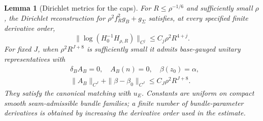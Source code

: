 \documentclass[11pt]{amsart}
\newtheorem{lemma}[theorem]{Lemma}
\theoremstyle{definition}
\theoremstyle{remark}
\theoremstyle{plain}
\begin{document}
\begin{lemma}[Dirichlet metrics for the caps]\label{lem:cap-dirichlet-metric}
For $R\leq\rho^{-1/6}$ and sufficiently small $\rho$, the
Dirichlet reconstruction for $\rho^2f_R^2g_B+g_\Sigma$ satisfies,
at every specified finite derivative order,
\begin{equation}\label{eq:cap-metric-unscaled}
 \|\log(H_0^{-1}H_{\rho,R})\|_{C^j}
                              \leq C_j\rho^2R^{4+j}.
\end{equation}
For fixed $J$, when $\rho^2R^{J+8}$ is sufficiently small it
admits base-gauged unitary representatives with
\begin{equation}\label{eq:cap-background-bound}
 \begin{split}
 &\delta_BA_B=0,\quad A_B(n)=0,\quad \beta(z_0)=\alpha,\\
 &\|A_B\|_{C^J}+\|\beta-\beta_0\|_{C^J}
                                      \leq C_J\rho^2R^{J+8}.
 \end{split}
\end{equation}
They satisfy the canonical matching with $u_E$. Constants are
uniform on compact smooth seam-admissible bundle families; a finite
number of bundle-parameter derivatives is obtained by increasing
the derivative order used in the estimate.
\end{lemma}
\end{document}
